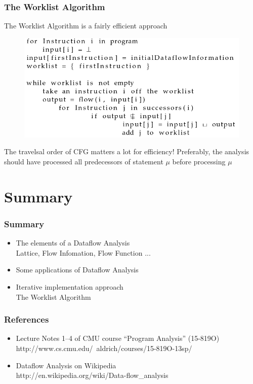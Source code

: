 \documentclass[]{beamer}
\begin{document}
\begin{frame}
  \frametitle{The Worklist Algorithm}
  The Worklist Algorithm is a fairly efficient approach
  \begin{figure}
    \includegraphics[width=.65\textwidth]{figures/worklist}
  \end{figure}

  \vspace{1em}\pause
  The travelsal order of CFG matters a lot for efficiency!
  Preferably, the analysis should have
  processed all predecessors of statement $\mu$ before processing $\mu$
\end{frame}




\section{Summary}
\frame{\tableofcontents[currentsection]}

\begin{frame}
  \frametitle{Summary}
  \begin{itemize}
    \item The elements of a Dataflow Analysis\\
      Lattice, Flow Infomation, Flow Function ...
    \item Some applications of Dataflow Analysis
    \item Iterative implementation approach\\
      The Worklist Algorithm
  \end{itemize}
\end{frame}

\begin{frame}
  \frametitle{References}
  \begin{itemize}
    \item Lecture Notes 1--4 of CMU course ``Program Analysis'' (15-819O)\\
      http://www.cs.cmu.edu/~aldrich/courses/15-819O-13sp/
    \item Dataflow Analysis on Wikipedia\\
      http://en.wikipedia.org/wiki/Data-flow\_analysis
  \end{itemize}
\end{frame}

\end{document}
